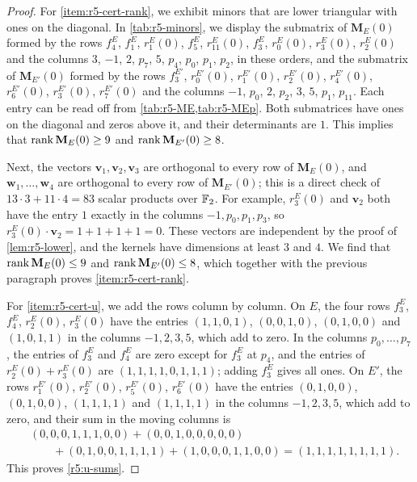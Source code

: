 \begin{proof}
For \ref{item:r5-cert-rank}, we exhibit minors that are lower triangular with ones on the diagonal. In \cref{tab:r5-minors}, we display the submatrix of $\mathbf M_E(0)$ formed by the rows $f^E_4$, $f^E_1$, $r^E_1(0)$, $f^E_5$, $r^E_{11}(0)$, $f^E_3$, $r^E_0(0)$, $r^E_3(0)$, $r^E_2(0)$ and the columns $3$, $-1$, $2$, $p_7$, $5$, $p_4$, $p_0$, $p_1$, $p_2$, in these orders, and the submatrix of $\mathbf M_{E'}(0)$ formed by the rows $f^{E'}_3$, $r^{E'}_0(0)$, $r^{E'}_1(0)$, $r^{E'}_2(0)$, $r^{E'}_4(0)$, $r^{E'}_6(0)$, $r^{E'}_3(0)$, $r^{E'}_7(0)$ and the columns $-1$, $p_0$, $2$, $p_2$, $3$, $5$, $p_1$, $p_{11}$. Each entry can be read off from \cref{tab:r5-ME,tab:r5-MEp}. Both submatrices have ones on the diagonal and zeros above it, and their determinants are $1$. This implies that $\operatorname{rank}\mathbf M_E(0)\ge9$ and $\operatorname{rank}\mathbf M_{E'}(0)\ge8$.

Next, the vectors $\mathbf v_1,\mathbf v_2,\mathbf v_3$ are orthogonal to every row of $\mathbf M_E(0)$, and $\mathbf w_1,\dots,\mathbf w_4$ are orthogonal to every row of $\mathbf M_{E'}(0)$; this is a direct check of $13\cdot3+11\cdot4=83$ scalar products over $\mathbb F_2$. For example, $r^E_3(0)$ and $\mathbf v_2$ both have the entry $1$ exactly in the columns $-1,p_0,p_1,p_3$, so $r^E_3(0)\cdot \mathbf v_2=1+1+1+1=0$. These vectors are independent by the proof of \cref{lem:r5-lower}, and the kernels have dimensions at least $3$ and $4$. We find that $\operatorname{rank}\mathbf M_E(0)\le9$ and $\operatorname{rank}\mathbf M_{E'}(0)\le8$, which together with the previous paragraph proves \ref{item:r5-cert-rank}.

For \ref{item:r5-cert-u}, we add the rows column by column. On $E$, the four rows $f^E_3$, $f^E_4$, $r^E_2(0)$, $r^E_3(0)$ have the entries $(1,1,0,1)$, $(0,0,1,0)$, $(0,1,0,0)$ and $(1,0,1,1)$ in the columns $-1,2,3,5$, which add to zero. In the columns $p_0,\dots,p_7$, the entries of $f^E_3$ and $f^E_4$ are zero except for $f^E_3$ at $p_4$, and the entries of $r^E_2(0)+r^E_3(0)$ are $(1,1,1,1,0,1,1,1)$; adding $f^E_3$ gives all ones. On $E'$, the rows $r^{E'}_1(0)$, $r^{E'}_2(0)$, $r^{E'}_5(0)$, $r^{E'}_6(0)$ have the entries $(0,1,0,0)$, $(0,1,0,0)$, $(1,1,1,1)$ and $(1,1,1,1)$ in the columns $-1,2,3,5$, which add to zero, and their sum in the moving columns is
\[
\begin{aligned}
&(0,0,0,1,1,1,0,0)+(0,0,1,0,0,0,0,0)\\
&\qquad+(0,1,0,0,1,1,1,1)+(1,0,0,0,1,1,0,0)=(1,1,1,1,1,1,1,1).
\end{aligned}
\]
This proves \eqref{r5:u-sums}.
\end{proof}


